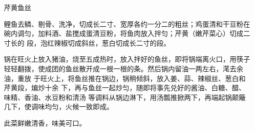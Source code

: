 %
%
%
%
%
%
%
\begin{recipe}{芹黄鱼丝}

\ingredients


\preparation

\step 鲤鱼去鳞、剔骨、洗净，切成长二寸、宽厚各约一分二的粗丝；鸡蛋清和干豆粉在
碗内调匀，加料酒、盐搅成蛋清豆粉，将鱼肉放入拌匀；芹黄（嫩芹菜心）切成二寸长的
段，泡红辣椒切成斜丝，葱白切成长二寸的段。

\step 锅在旺火上放入猪油，烧至五成热时，放入拌好的鱼丝，即将锅端离火口，用筷子
轻轻翻拨，使成团的鱼丝散开成一根一根的条。然后锅内留油一两左右，滗去余油，重放
于旺火上，将鱼丝推在锅边，锅稍倾斜，放入姜、蒜、辣椒丝、葱白和芹黄段，煸炒十余
下，再与鱼丝一起炒匀，随即将事先兑好的酱油、白糖、醋、味精、香油、水豆粉和清汤
等调料从锅边淋下，用汤瓢推掀两下，再端起锅颠簸几下，使调味均匀，火候一致即成。

\features

此菜鲜嫩清香，味美可口。

\end{recipe}

